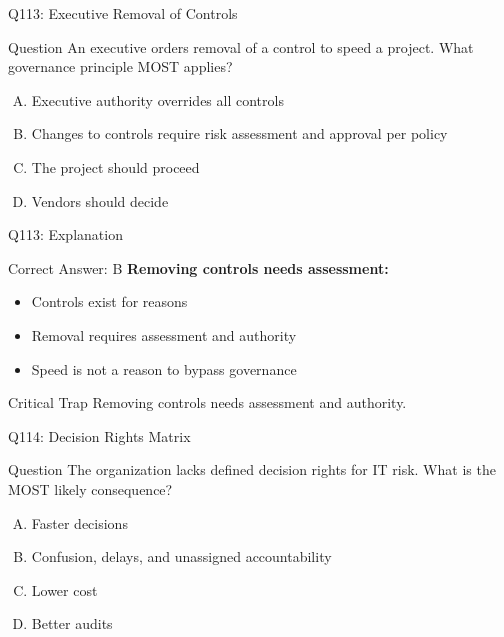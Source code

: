 \documentclass{beamer}
\begin{document}
	\begin{frame}{Q113: Executive Removal of Controls}
		\begin{block}{Question}
			An executive orders removal of a control to speed a project. What governance principle MOST applies?
		\end{block}
		\begin{enumerate}[(A)]
			\item Executive authority overrides all controls
			\item Changes to controls require risk assessment and approval per policy
			\item The project should proceed
			\item Vendors should decide
		\end{enumerate}
	\end{frame}
	
	\begin{frame}{Q113: Explanation}
		\begin{block}{Correct Answer: B}
			\textbf{Removing controls needs assessment:}
			\begin{itemize}
				\item Controls exist for reasons
				\item Removal requires assessment and authority
				\item Speed is not a reason to bypass governance
			\end{itemize}
		\end{block}
		\begin{alertblock}{Critical Trap}
			Removing controls needs assessment and authority.
		\end{alertblock}
	\end{frame}
	
	\begin{frame}{Q114: Decision Rights Matrix}
		\begin{block}{Question}
			The organization lacks defined decision rights for IT risk. What is the MOST likely consequence?
		\end{block}
		\begin{enumerate}[(A)]
			\item Faster decisions
			\item Confusion, delays, and unassigned accountability
			\item Lower cost
			\item Better audits
		\end{enumerate}
	\end{frame}
	
\end{document}
